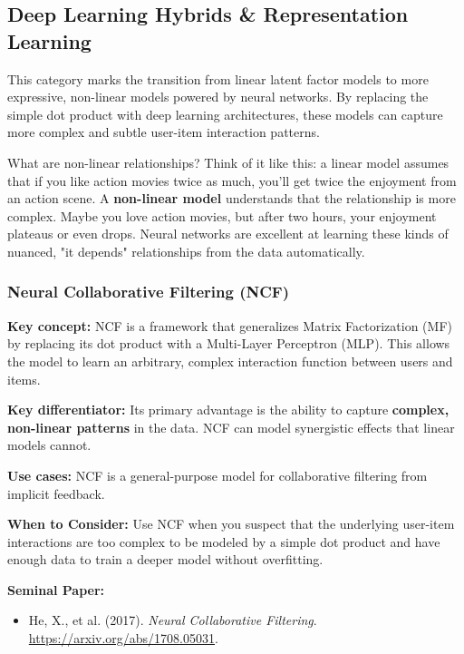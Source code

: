 \documentclass{article}
\begin{document}
    \subsection{Deep Learning Hybrids \& Representation Learning}
    This category marks the transition from linear latent factor models to more expressive, non-linear models powered by neural networks. By replacing the simple dot product with deep learning architectures, these models can capture more complex and subtle user-item interaction patterns.
    
    \begin{asidebox}{What are non-linear relationships?}
    Think of it like this: a linear model assumes that if you like action movies twice as much, you'll get twice the enjoyment from an action scene. A \textbf{non-linear model} understands that the relationship is more complex. Maybe you love action movies, but after two hours, your enjoyment plateaus or even drops. Neural networks are excellent at learning these kinds of nuanced, "it depends" relationships from the data automatically.
    \end{asidebox}

    \subsubsection{Neural Collaborative Filtering (NCF)}
\noindent\textbf{Key concept:} NCF is a framework that generalizes Matrix Factorization (MF) by replacing its dot product with a Multi-Layer Perceptron (MLP). This allows the model to learn an arbitrary, complex interaction function between users and items.

\noindent\textbf{Key differentiator:} Its primary advantage is the ability to capture \textbf{complex, non-linear patterns} in the data. NCF can model synergistic effects that linear models cannot.

\noindent\textbf{Use cases:} NCF is a general-purpose model for collaborative filtering from implicit feedback.

\noindent\textbf{When to Consider:} Use NCF when you suspect that the underlying user-item interactions are too complex to be modeled by a simple dot product and have enough data to train a deeper model without overfitting.

\noindent\textbf{Seminal Paper:}
    \begin{itemize}
        \item He, X., et al. (2017). \textit{Neural Collaborative Filtering}. \url{https://arxiv.org/abs/1708.05031}.
    \end{itemize}
\end{document}
